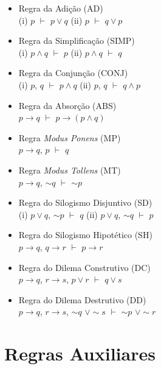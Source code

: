 \documentclass[12pt,a4paper,oneside]{article}
\begin{document}
\begin{itemize}
	\item Regra da Adição (AD) \\
	(i) $p$ $\vdash$ $p\vee q$ \hspace*{0.5cm} (ii) $p$ $\vdash$ $q \vee p$
	\item Regra da Simplificação (SIMP) \\
	(i) $p \wedge q$ $\vdash$ $p$ \hspace*{0.5cm} (ii) $p \wedge q$ $\vdash$ $q$
	\item Regra da Conjunção (CONJ) \\
	(i) $p$, $q$ $\vdash$ $p \wedge q$ \hspace*{0.5cm} (ii) $p$, $q$ $\vdash$ $q \wedge p$
	\item Regra da Absorção (ABS) \\
	$p \rightarrow q$ $\vdash$ $p \rightarrow (p \wedge q)$
	\item Regra {\it Modus Ponens} (MP) \\
	$p \rightarrow q$, $p$ $\vdash$ $q$
	\item Regra {\it Modus Tollens} (MT) \\
	$p \rightarrow q$, $\sim q$ $\vdash$ $\sim p$
	\item Regra do Silogismo Disjuntivo (SD) \\
	(i) $p \vee q$, $\sim p$ $\vdash$ $q$ \hspace*{0.5cm} (ii) $p \vee q$, $\sim q$ $\vdash$ $p$
	\item Regra do Silogismo Hipotético (SH) \\
		$p \rightarrow q$, $q \rightarrow r$ $\vdash$ $p \rightarrow r$
	\item Regra do Dilema Construtivo (DC) \\
		$p \rightarrow q$, $r \rightarrow s$, $p \vee r$ $\vdash$ $q \vee s$
	\item Regra do Dilema Destrutivo (DD) \\
		$p \rightarrow q$, $r \rightarrow s$, $\sim q$ $\vee \sim s$ $\vdash$ $\sim p$ $\vee \sim r$
\end{itemize}

\section*{Regras Auxiliares}
\end{document}
